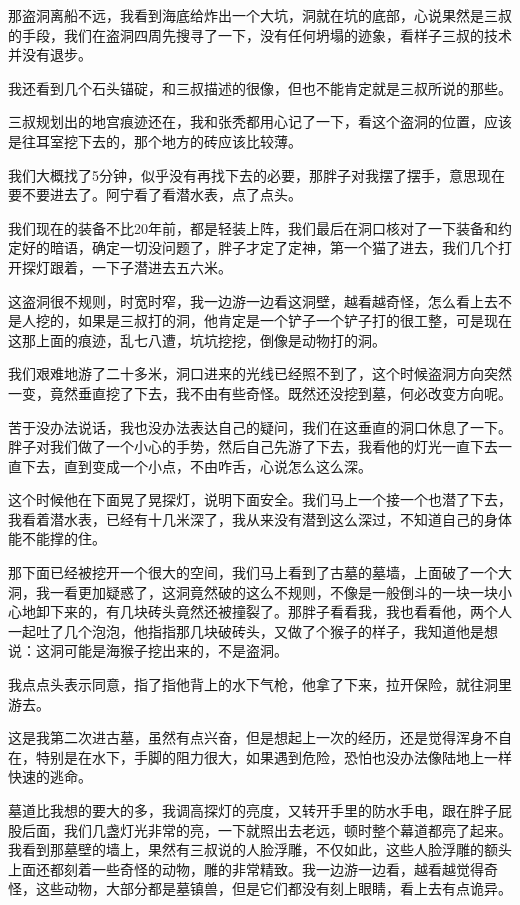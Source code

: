 那盗洞离船不远，我看到海底给炸出一个大坑，洞就在坑的底部，心说果然是三叔的手段，我们在盗洞四周先搜寻了一下，没有任何坍塌的迹象，看样子三叔的技术并没有退步。

我还看到几个石头锚碇，和三叔描述的很像，但也不能肯定就是三叔所说的那些。

三叔规划出的地宫痕迹还在，我和张秃都用心记了一下，看这个盗洞的位置，应该是往耳室挖下去的，那个地方的砖应该比较薄。

我们大概找了5分钟，似乎没有再找下去的必要，那胖子对我摆了摆手，意思现在要不要进去了。阿宁看了看潜水表，点了点头。

我们现在的装备不比20年前，都是轻装上阵，我们最后在洞口核对了一下装备和约定好的暗语，确定一切没问题了，胖子才定了定神，第一个猫了进去，我们几个打开探灯跟着，一下子潜进去五六米。

这盗洞很不规则，时宽时窄，我一边游一边看这洞壁，越看越奇怪，怎么看上去不是人挖的，如果是三叔打的洞，他肯定是一个铲子一个铲子打的很工整，可是现在这那上面的痕迹，乱七八遭，坑坑挖挖，倒像是动物打的洞。

我们艰难地游了二十多米，洞口进来的光线已经照不到了，这个时候盗洞方向突然一变，竟然垂直挖了下去，我不由有些奇怪。既然还没挖到墓，何必改变方向呢。

苦于没办法说话，我也没办法表达自己的疑问，我们在这垂直的洞口休息了一下。胖子对我们做了一个小心的手势，然后自己先游了下去，我看他的灯光一直下去一直下去，直到变成一个小点，不由咋舌，心说怎么这么深。

这个时候他在下面晃了晃探灯，说明下面安全。我们马上一个接一个也潜了下去，我看着潜水表，已经有十几米深了，我从来没有潜到这么深过，不知道自己的身体能不能撑的住。

那下面已经被挖开一个很大的空间，我们马上看到了古墓的墓墙，上面破了一个大洞，我一看更加疑惑了，这洞竟然破的这么不规则，不像是一般倒斗的一块一块小心地卸下来的，有几块砖头竟然还被撞裂了。那胖子看看我，我也看看他，两个人一起吐了几个泡泡，他指指那几块破砖头，又做了个猴子的样子，我知道他是想说：这洞可能是海猴子挖出来的，不是盗洞。

我点点头表示同意，指了指他背上的水下气枪，他拿了下来，拉开保险，就往洞里游去。

这是我第二次进古墓，虽然有点兴奋，但是想起上一次的经历，还是觉得浑身不自在，特别是在水下，手脚的阻力很大，如果遇到危险，恐怕也没办法像陆地上一样快速的逃命。

墓道比我想的要大的多，我调高探灯的亮度，又转开手里的防水手电，跟在胖子屁股后面，我们几盏灯光非常的亮，一下就照出去老远，顿时整个幕道都亮了起来。我看到那墓壁的墙上，果然有三叔说的人脸浮雕，不仅如此，这些人脸浮雕的额头上面还都刻着一些奇怪的动物，雕的非常精致。我一边游一边看，越看越觉得奇怪，这些动物，大部分都是墓镇兽，但是它们都没有刻上眼睛，看上去有点诡异。

